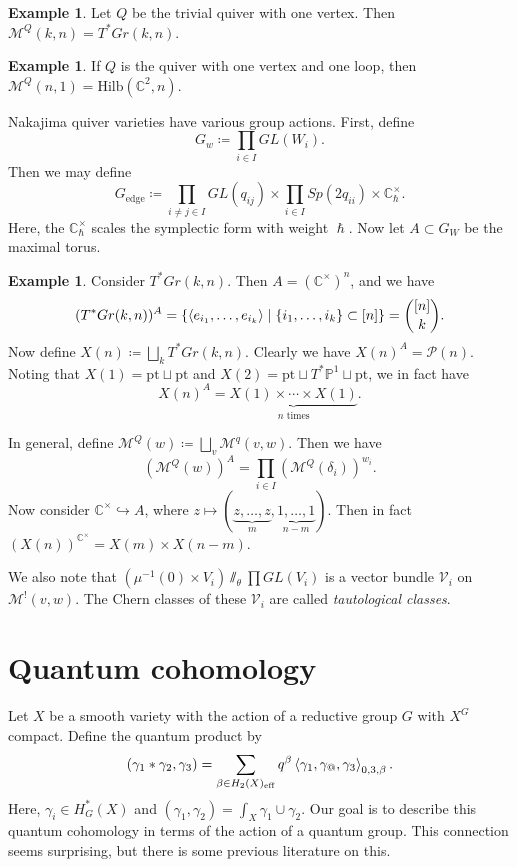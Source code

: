 \documentclass[leqno, openany]{memoir}
\theoremstyle{definition}
\newtheorem{exm}[thm]{Example}
\theoremstyle{remark}
\theoremstyle{plain}
\theoremstyle{definition}
\theoremstyle{remark}
\newcommand{\C}{\mathbb{C}}
\renewcommand{\P}{\mathbb{P}}
\newcommand{\mc}[1]{\mathcal{#1}}
\newcommand{\mr}[1]{\mathrm{#1}}
\begin{document}
\begin{exm}
    Let $Q$ be the trivial quiver with one vertex. Then $\mc{M}^Q(k, n) = T^* Gr(k, n)$.
\end{exm}

\begin{exm}
    If $Q$ is the quiver with one vertex and one loop, then $\mc{M}^Q(n, 1) = \mr{Hilb}(\C^2, n)$.
\end{exm}

Nakajima quiver varieties have various group actions. First, define
\[ G_w \coloneqq \prod_{i \in I} GL(W_i). \]
Then we may define
\[ G_{\mr{edge}} \coloneqq \prod_{i \neq j \in I} GL(q_{ij}) \times \prod_{i \in I} Sp(2 q_{ii}) \times \C_{\hslash}^{\times}. \]
Here, the $\C^{\times}_{\hslash}$ scales the symplectic form with weight $\hslash$. Now let $A \subset G_W$ be the maximal torus. 

\begin{exm}
    Consider $T^* Gr(k, n)$. Then $A = (\C^{\times})^n$, and we have
    \[ (T^* Gr(k, n))^A = \qty{\ev{e_{i_1}, \ldots, e_{i_k}} \mid \qty{i_1, \ldots, i_k} \subset [n]} = \binom{[n]}{k}. \]
    Now define $X(n) \coloneqq \bigsqcup_k T^* Gr(k, n)$. Clearly we have $X(n)^A = \mc{P}(n)$. Noting that $X(1) = \mr{pt} \sqcup \mr{pt}$ and $X(2) = \mr{pt} \sqcup T^* \P^1 \sqcup \mr{pt}$, we in fact have
    \[ X(n)^A = \underbrace{X(1) \times \cdots \times X(1)}_{n\text{ times}}. \]
\end{exm}

In general, define $\mc{M}^Q(w) \coloneqq \bigsqcup_v \mc{M}^q(v, w)$. Then we have
\[ (\mc{M}^Q(w))^A = \prod_{i \in I} (\mc{M}^Q(\delta_i))^{w_i}. \]
Now consider $\C^{\times} \hookrightarrow A$, where $z \mapsto (\underbrace{z, \ldots, z}_m, \underbrace{1, \ldots, 1}_{n-m})$. Then in fact $(X(n))^{\C^{\times}} = X(m) \times X(n-m)$.

We also note that $(\mu^{-1}(0) \times V_i) \sslash_{\theta} \prod GL(V_i)$ is a vector bundle $\mc{V}_i$ on $\mc{M}^!(v, w)$. The Chern classes of these $\mc{V}_i$ are called \textit{tautological classes}.

\section{Quantum cohomology}

Let $X$ be a smooth variety with the action of a reductive group $G$ with $X^G$ compact. Define the quantum product by
\[ (\gamma_1 * \gamma_2, \gamma_3) = \sum_{\beta \in H_2(X)_{\mr{eff}}} q^{\beta} \ev{\gamma_1, \gamma_@, \gamma_3}_{0,3,\beta}. \]
Here, $\gamma_i \in H_G^*(X)$ and $(\gamma_1, \gamma_2) = \int_X \gamma_1 \cup \gamma_2$. Our goal is to describe this quantum cohomology in terms of the action of a quantum group. This connection seems surprising, but there is some previous literature on this.
\end{document}
